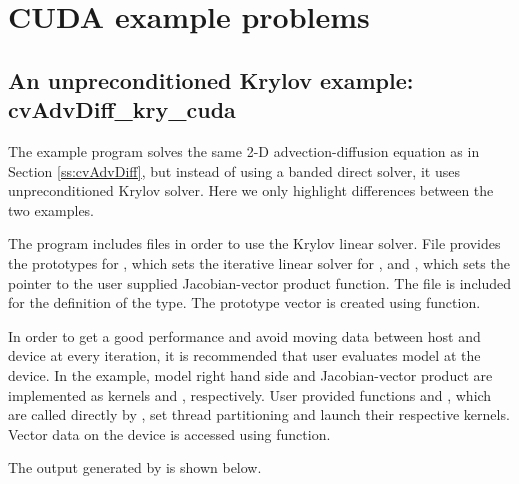 \section{CUDA example problems}\label{s:ex_cuda}



\subsection{An unpreconditioned Krylov example: cvAdvDiff\_kry\_cuda}\label{ss:cvAdvDiff_cuda}

The example program  solves the same 2-D 
advection-diffusion equation as in Section \ref{ss:cvAdvDiff}, but
instead of using a banded direct solver, it uses unpreconditioned 
Krylov solver. Here we only highlight differences between the two 
examples. 

The  program includes files
 in order to use the {\spgmr}
Krylov linear solver. File  provides the prototypes for 
, which sets the iterative linear solver for
{\cvode}, and , which sets the pointer to the user
supplied Jacobian-vector product function.
The file  is included for the definition of the {\cuda}
 type. The prototype vector is created
using  function. 

In order to get a good performance and avoid moving data between host
and device at every iteration, it is recommended that user evaluates  
model at the device. In the example, model right hand side and Jacobian-vector
product are implemented as {\cuda} kernels  and ,
respectively. User provided {\CC} functions  and , which are called
directly by {\cvode}, set thread partitioning and launch their respective 
{\cuda} kernels. Vector data on the device is accessed using 
 function.

The output generated by  is shown below.



